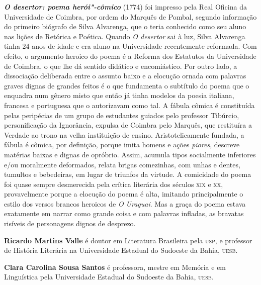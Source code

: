 \textbf{\textit{O desertor: poema herói"-cômico}} (1774) foi impresso pela Real
Oficina da Universidade de Coimbra, por ordem do Marquês de Pombal,
segundo informação do primeiro biógrafo de Silva Alvarenga, que o teria conhecido
como seu aluno nas lições de Retórica e Poética.
Quando \textit{O desertor} sai à luz, Silva Alvarenga tinha 24 anos de
idade e era aluno na Universidade recentemente reformada.
Com efeito, o argumento heroico do poema é a Reforma dos Estatutos da
Universidade de Coimbra, o que lhe dá sentido didático e encomiástico.
Por outro lado, a dissociação deliberada entre o assunto baixo e a elocução
ornada com palavras graves dignas de grandes feitos é o que fundamenta o
subtítulo do poema que o enquadra num gênero misto que então já tinha modelos
da poesia italiana, francesa e portuguesa que o autorizavam como tal.
A fábula cômica é constituída pelas peripécias de um grupo de estudantes
guiados pelo professor Tibúrcio, personificação da Ignorância, expulsa
de Coimbra pelo Marquês, que restituíra a Verdade ao trono na velha
instituição de ensino.
Aristotelicamente fundada, a fábula é cômica, por definição, porque imita
homens e ações \textit{piores}, descreve matérias baixas e dignas de opróbrio.
Assim, acumula tipos socialmente inferiores e/ou moralmente deformados,
relata brigas comezinhas, com unhas e dentes, tumultos e bebedeiras, em lugar
de triunfos da virtude.
A comicidade do poema foi quase sempre desmerecida pela crítica literária
dos séculos \textsc{xix} e \textsc{xx}, provavelmente porque a elocução do poema é alta,
imitando principalmente o estilo dos versos brancos heroicos de \textit{O Uraguai}.
Mas a graça do poema estava exatamente em narrar como grande coisa e com palavras
infladas, as bravatas risíveis de personagens dignos de desprezo.


\textbf{Ricardo Martins Valle} é doutor em Literatura Brasileira pela
\textsc{usp}, e professor de História Literária na Universidade Estadual do
Sudoeste da Bahia, \textsc{uesb}.


\textbf{Clara Carolina Sousa Santos} é professora, mestre em Memória e em Linguística pela Universidade Estadual do Sudoeste da Bahia, \textsc{uesb}. 


